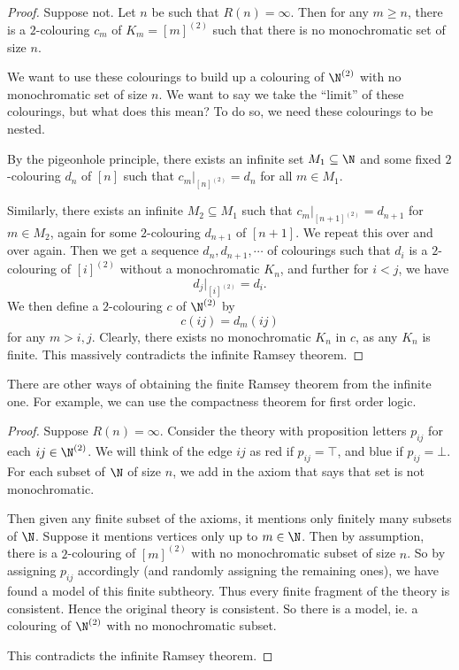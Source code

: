 \documentclass[a4paper]{article}
\begin{document}
\begin{proof}
  Suppose not. Let $n$ be such that $R(n) = \infty$. Then for any $m \geq n$, there is a $2$-colouring $c_m$ of $K_m = [m]^{(2)}$ such that there is no monochromatic set of size $n$.

  We want to use these colourings to build up a colouring of $\N^{(2)}$ with no monochromatic set of size $n$. We want to say we take the ``limit'' of these colourings, but what does this mean? To do so, we need these colourings to be nested.

  By the pigeonhole principle, there exists an infinite set $M_1 \subseteq \N$ and some fixed $2$-colouring $d_n$ of $[n]$ such that $c_m|_{[n]^{(2)}} = d_n$ for all $m \in M_1$.

  Similarly, there exists an infinite $M_2 \subseteq M_1$ such that $c_m|_{[n + 1]^{(2)}} = d_{n + 1}$ for $m \in M_2$, again for some $2$-colouring $d_{n + 1}$ of $[n + 1]$. We repeat this over and over again. Then we get a sequence $d_n, d_{n + 1}, \cdots$ of colourings such that $d_i$ is a $2$-colouring of $[i]^{(2)}$ without a monochromatic $K_n$, and further for $i < j$, we have
  \[
    d_j|_{[i]^{(2)}} = d_i.
  \]
  We then define a $2$-colouring $c$ of $\N^{(2)}$ by
  \[
    c(ij) = d_m(ij)
  \]
  for any $m > i, j$. Clearly, there exists no monochromatic $K_n$ in $c$, as any $K_n$ is finite. This massively contradicts the infinite Ramsey theorem.
\end{proof}

There are other ways of obtaining the finite Ramsey theorem from the infinite one. For example, we can use the compactness theorem for first order logic.
\begin{proof}
  Suppose $R(n) = \infty$. Consider the theory with proposition letters $p_{ij}$ for each $ij \in \N^{(2)}$. We will think of the edge $ij$ as red if $p_{ij} = \top$, and blue if $p_{ij} = \bot$. For each subset of $\N$ of size $n$, we add in the axiom that says that set is not monochromatic.

  Then given any finite subset of the axioms, it mentions only finitely many subsets of $\N$. Suppose it mentions vertices only up to $m \in \N$. Then by assumption, there is a $2$-colouring of $[m]^{(2)}$ with no monochromatic subset of size $n$. So by assigning $p_{ij}$ accordingly (and randomly assigning the remaining ones), we have found a model of this finite subtheory. Thus every finite fragment of the theory is consistent. Hence the original theory is consistent. So there is a model, ie. a colouring of $\N^{(2)}$ with no monochromatic subset.

  This contradicts the infinite Ramsey theorem.
\end{proof}
\end{document}
